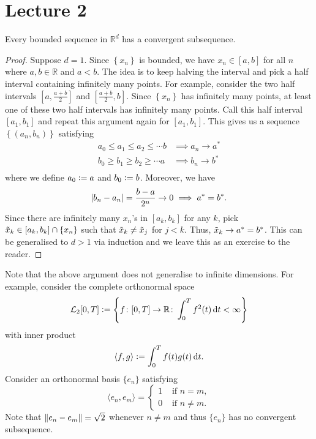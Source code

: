 \section{Lecture 2}

\begin{thm}
    Every bounded sequence in $\mathbb{R}^d$ has a convergent subsequence.
\end{thm}
\begin{proof}
    Suppose $d = 1$. Since $\left\{ x_n \right\}$ is bounded, we have $x_n \in [a,b]$ for all $n$ where $a,b \in \mathbb{R}$ and $a < b$. The idea is to keep halving the interval and pick a half interval containing infinitely many points. For example, consider the two half intervals $[a, \frac{a+b}{2}]$ and $[\frac{a+b}{2}, b]$. Since $\left\{ x_n \right\}$ has infinitely many points, at least one of these two half intervals has infinitely many points. Call this half interval $[a_1, b_1]$ and repeat this argument again for $[a_1, b_1]$. This gives us a sequence $\left\{ (a_n, b_n) \right\}$ satisfying 
    \begin{align*}
        a_0 \leq a_1 \leq a_2 \leq \cdots b &\implies a_n \to a^* \\
        b_0 \geq b_1 \geq b_2 \geq \cdots a &\implies b_n \to b^* \\
    \end{align*}
    where we define $a_0 \vcentcolon= a$ and $b_0 \vcentcolon= b$. Moreover, we have
    \[
        \abs{b_n - a_n} = \frac{b-a}{2^n} \to 0 \implies a^* = b^*.
    \]
    Since there are infinitely many $x_n$'s in $[a_k, b_k]$ for any $k$, pick $\Tilde{x}_k \in [a_k,b_k] \cap \{x_n\}$ such that $\Tilde{x}_k \neq \Tilde{x}_j$ for $j < k$. Thus, $\Tilde{x}_k \to a^* = b^*$. This can be generalised to $d > 1$ via induction and we leave this as an exercise to the reader.
\end{proof}

Note that the above argument does not generalise to infinite dimensions. For example, consider the complete orthonormal space
\[
    \mathcal{L}_2[0,T] \vcentcolon= \left\{ f \colon [0,T] \to \mathbb{R} \colon \int_0^T f^2(t) \, \mathrm{d} t < \infty \right\}
\]
with inner product
\[
    \langle f,g \rangle \vcentcolon= \int_0^T f(t) g(t) \, \mathrm{d} t.
\]
Consider an orthonormal basis $\{e_n\}$ satisfying 
\[
    \langle e_n, e_m \rangle = 
    \begin{cases}
        1 & \text{ if } n = m, \\
        0 & \text{ if } n \neq m.
    \end{cases}
\]
Note that $\norm{e_n - e_m} = \sqrt{2}$ whenever $n \neq m$ and thus $\{e_n\}$ has no convergent subsequence. 

